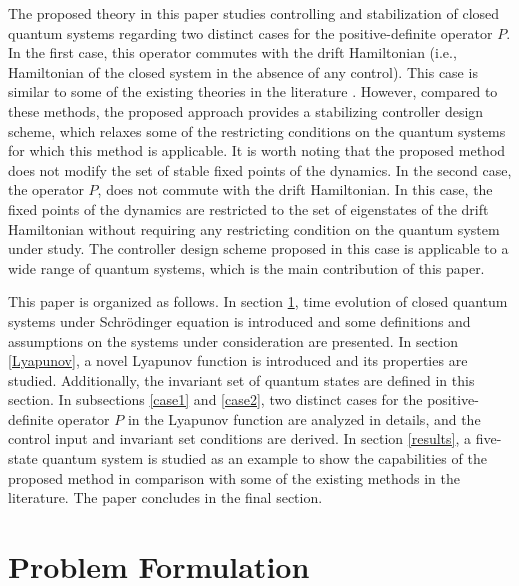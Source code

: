 \documentclass[journal]{IEEEtran}
\theoremstyle{definition}
\begin{document}
The proposed theory in this paper studies controlling and stabilization of closed quantum systems regarding two distinct cases for the positive-definite operator $P$. In the first case, this operator commutes with the drift Hamiltonian (i.e., Hamiltonian of the closed system in the absence of any control). This case is similar to some of the existing theories in the literature \cite{mirrahimi2005lyapunov,kuang2008lyapunov,zhao2012switching}. However, compared to these methods, the proposed approach provides a stabilizing controller design scheme, which relaxes some of the restricting conditions on the quantum systems for which this method is applicable. It is worth noting that the proposed method does not modify the set of stable fixed points of the dynamics. In the second case, the operator $P$, does not commute with the drift Hamiltonian. In this case, the fixed points of the dynamics are restricted to the set of eigenstates of the drift Hamiltonian without requiring any restricting condition on the quantum system under study. The controller design scheme proposed in this case is applicable to a wide range of quantum systems, which is the main contribution of this paper. 

\par This paper is organized as follows. In section \ref{problem}, time evolution of closed quantum systems under Schr\"odinger equation is introduced and some definitions and assumptions on the systems under consideration are presented. In section \ref{Lyapunov}, a novel Lyapunov function is introduced and its properties are studied. Additionally, the invariant set of quantum states are defined in this section. In subsections \ref{case1} and \ref{case2}, two distinct cases for the positive-definite operator $P$ in the Lyapunov function are analyzed in details, and the control input and invariant set conditions are derived. In section \ref{results}, a five-state quantum system is studied as an example to show the capabilities of the proposed method in comparison with some of the existing methods in the literature. The paper concludes in the final section. 


\section{Problem Formulation}\label{problem}
\end{document}
